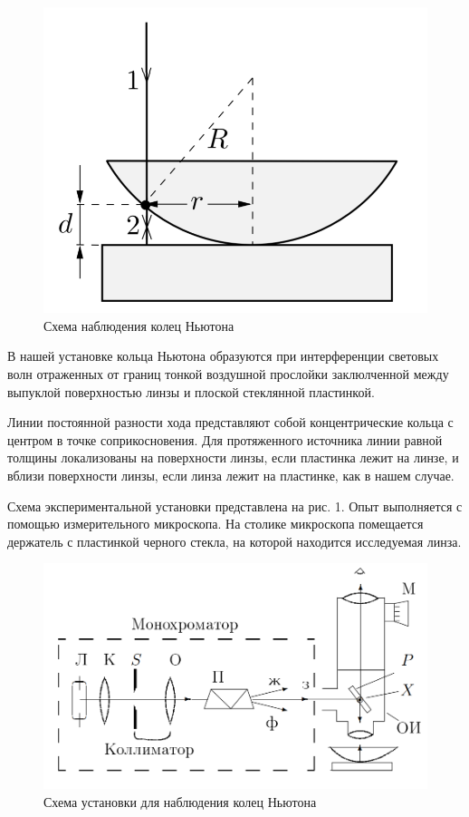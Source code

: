 \documentclass[a4paper, 12pt]{article}%
\begin{document}
\begin{figure}[h!]
\centering
\includegraphics[scale=0.5]{images/scheme_0.png}
\caption{Схема наблюдения колец Ньютона}
\label{scheme_0}
\end{figure}

В нашей установке кольца Ньютона образуются при интерференции световых волн отраженных от границ тонкой воздушной прослойки заклюлченной между выпуклой поверхностью линзы и плоской стеклянной пластинкой.

Линии постоянной разности хода представляют собой концентрические кольца с центром в точке соприкосновения. Для протяженного источника линии равной толщины локализованы на поверхности линзы, если пластинка лежит на линзе, и вблизи поверхности линзы, если линза лежит на пластинке, как в нашем случае.

\vspace{0.5cm}

Схема экспериментальной установки представлена на рис. 1. Опыт выполняется с помощью измерительного микроскопа. На столике микроскопа помещается держатель с пластинкой черного стекла, на которой находится исследуемая линза.

\begin{figure}[h!]
\centering
\includegraphics[scale=0.5]{images/scheme.png}
\caption{Схема установки для наблюдения колец Ньютона}
\label{scheme}
\end{figure}
\end{document}
